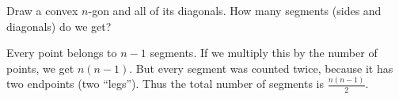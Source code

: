 

\setcounter{section}{1}
\setcounter{subsection}{4}
\setcounter{dfn}{4}

\begin{exl}
Draw a convex $n$-gon and all of its diagonals.
How many segments (sides and diagonals) do we get?

Every point belongs to $n-1$ segments.
If we multiply this by the number of points, we get $n(n-1)$.
But every segment was counted twice, because it has two endpoints (two ``legs'').
Thus the total number of segments is $\frac{n(n-1)}2$.
\end{exl}

